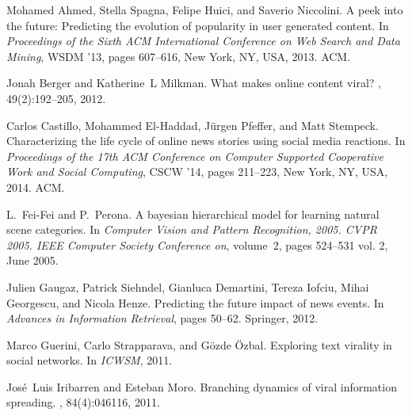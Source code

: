 \documentclass[10pt,letterpaper]{article}
\begin{document}
\nolinenumbers

%
%
% 

\begin{thebibliography}{10}

Mohamed Ahmed, Stella Spagna, Felipe Huici, and Saverio Niccolini.
\newblock A peek into the future: Predicting the evolution of popularity in
  user generated content.
\newblock In {\em Proceedings of the Sixth ACM International Conference on Web
  Search and Data Mining}, WSDM '13, pages 607--616, New York, NY, USA, 2013.
  ACM.

Jonah Berger and Katherine~L Milkman.
\newblock What makes online content viral?
, 49(2):192--205, 2012.

Carlos Castillo, Mohammed El-Haddad, J\"{u}rgen Pfeffer, and Matt Stempeck.
\newblock Characterizing the life cycle of online news stories using social
  media reactions.
\newblock In {\em Proceedings of the 17th ACM Conference on Computer Supported
  Cooperative Work and Social Computing}, CSCW '14, pages 211--223, New York,
  NY, USA, 2014. ACM.

L.~Fei-Fei and P.~Perona.
\newblock A bayesian hierarchical model for learning natural scene categories.
\newblock In {\em Computer Vision and Pattern Recognition, 2005. CVPR 2005.
  IEEE Computer Society Conference on}, volume~2, pages 524--531 vol. 2, June
  2005.

Julien Gaugaz, Patrick Siehndel, Gianluca Demartini, Tereza Iofciu, Mihai
  Georgescu, and Nicola Henze.
\newblock Predicting the future impact of news events.
\newblock In {\em Advances in Information Retrieval}, pages 50--62. Springer,
  2012.

Marco Guerini, Carlo Strapparava, and G{\"o}zde {\"O}zbal.
\newblock Exploring text virality in social networks.
\newblock In {\em ICWSM}, 2011.

Jos{\'e}~Luis Iribarren and Esteban Moro.
\newblock Branching dynamics of viral information spreading.
, 84(4):046116, 2011.


\end{thebibliography}
\end{document}
